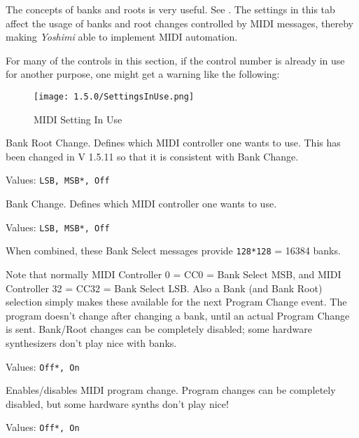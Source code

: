    \setcounter{ItemCounter}{0}      %

   The concepts of banks and roots is very useful.
   See .
   The settings in this tab affect the usage of banks and root changes
   controlled by MIDI messages, thereby making \textsl{Yoshimi} able to
   implement MIDI automation.

   For many of the controls in this section, if the control number is
   already in use for another purpose, one might get a warning like the
   following:

\begin{figure}[H]
   \centering
   \texttt{[image: 1.5.0/SettingsInUse.png]}
   \caption[MIDI Setting In Use]{MIDI Setting In Use}
   \label{fig:yoshimi_settings_in_use}
\end{figure}

   Bank Root Change.
   Defines which MIDI controller one wants to use. This has been changed in
   V 1.5.11 so that it is consistent with Bank Change.

   Values: \texttt{LSB, MSB*, Off}

   Bank Change.
   Defines which MIDI controller one wants to use.

   Values: \texttt{LSB, MSB*, Off}

   When combined, these Bank Select messages provide
   \texttt{128*128} = 16384 banks.

   Note that normally MIDI Controller 0 = CC0 = Bank Select MSB, and MIDI
   Controller 32 = CC32 = Bank Select LSB. Also a Bank (and Bank Root)
   selection simply makes these available for the next Program Change event.
   The program doesn't change after changing a bank, until an actual Program
   Change is sent.
   Bank/Root changes can be completely disabled; some hardware synthesizers
   don't play nice with banks.


   Values: \texttt{Off*, On}

   Enables/disables MIDI program change.
   Program changes can be completely disabled, but some hardware synths don't
   play nice!


   Values: \texttt{Off*, On}

